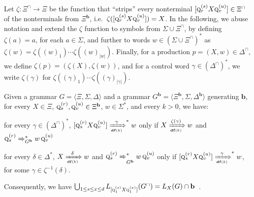 \documentclass[final]{llncs}
\def\tuple#1{{\langle #1 \rangle}}
\def\len#1{{\vert{#1}\vert}}
\def\prod{\Delta}
\def\pat{{\mathbf{b}}}
\def\df#1{\scriptscriptstyle\mathbf{df}(#1)}
\def\Vars{\ensuremath{\Xi}}
\begin{document}
Let $\zeta\colon \Vars^\cap \rightarrow \Vars$ be the function that
``strips'' every nonterminal $[\textsc{q}_r^{(s)} X \textsc{q}_{v}^{(u)}]
\in \Vars^\cap$ of the nonterminals from $\Vars^\pat$,
i.e.\ $\zeta([\textsc{q}_r^{(s)} X \textsc{q}_{v}^{(u)}]) = X$. In the
following, we abuse notation and extend the $\zeta$ function to
symbols from $\Sigma \cup \Vars^\cap$, by defining $\zeta(a)=a$, for
each $a \in \Sigma$, and further to words $w\in
(\Sigma \cup \Vars^\cap)^*$ as $\zeta(w) = \zeta( (w)_1
) \cdots \zeta( (w)_{\len{w}} )$. Finally, for a production $p =
(X,w) \in \prod^\cap$, we define $\zeta(p) = (\zeta(X), \zeta(w))$,
and for a control word $\gamma \in (\prod^\cap)^*$, we write
$\zeta(\gamma)$ for $\zeta( (\gamma)_1 ) \cdots \zeta(
(\gamma)_{\len{\gamma}} )$.

\begin{lemma}\label{lem:intersection}
Given a grammar $G = \tuple{\Vars,\Sigma,\prod}$ and a grammar $G^{\pat} =
\tuple{\Vars^{\pat},\Sigma,\prod^{\pat}}$ generating \(\pat\), for every
\(X\in\Vars\), \(\textsc{q}_{s}^{(r)},\textsc{q}_{v}^{(u)} \in \Vars^{\pat}\),
\(w\in\Sigma^*\), and every $k > 0$, we have:
  \begin{compactenum} 

\item\label{item:inter-only-if} for every
  $\gamma \in (\prod^\cap)^*$, $[\textsc{q}_{s}^{(r)}
  X \textsc{q}_{v}^{(u)}] \xRightarrow[\df{k}]{\gamma}^* w$ only if
  $X \xRightarrow[\df{k}]{\zeta(\gamma)} w$ and
  $\textsc{q}_{s}^{(r)}\Rightarrow_{G^{\pat}}^*
  w\, \textsc{q}_{v}^{(u)}$

 \item\label{item:inter-if} for every $\delta \in \prod^*$,
    $X \xRightarrow[\df{k}]{\delta} w$ and
    $\textsc{q}_{s}^{(r)}\xRightarrow{}_{G^{\pat}}^*
    w\, \textsc{q}_{v}^{(u)}$ only if $[\textsc{q}_{s}^{(r)}
    X \textsc{q}_{v}^{(u)}] \xRightarrow[\df{k}]{\gamma}^* w$, for
    some $\gamma \in \zeta^{-1}(\delta)$.  \end{compactenum}
    Consequently, we have $\bigcup_{1\leq s\leq x\leq d}
    L_{[\textsc{q}^{(s)}_1
    X \textsc{q}^{(x)}_{1}]}(G^{\cap})=L_X(G) \cap \pat \enspace$.
\end{lemma}
\end{document}
